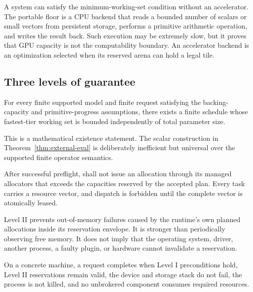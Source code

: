 A system can satisfy the minimum-working-set condition without an accelerator. The portable floor is a CPU backend that reads a bounded number of scalars or small vectors from persistent storage, performs a primitive arithmetic operation, and writes the result back. Such execution may be extremely slow, but it proves that GPU capacity is not the computability boundary. An accelerator backend is an optimization selected when its reserved arena can hold a legal tile.

\subsection{Three levels of guarantee}

\begin{definition}
For every finite supported model and finite request satisfying the backing-capacity and primitive-progress assumptions, there exists a finite schedule whose fastest-tier working set is bounded independently of total parameter size.
\end{definition}

This is a mathematical existence statement. The scalar construction in Theorem~\ref{thm:external-eval} is deliberately inefficient but universal over the supported finite operator semantics.

\begin{definition}
After successful preflight, \AMS shall not issue an allocation through its managed allocators that exceeds the capacities reserved by the accepted plan. Every task carries a resource vector, and dispatch is forbidden until the complete vector is atomically leased.
\end{definition}

Level II prevents out-of-memory failures caused by the runtime's own planned allocations inside its reservation envelope. It is stronger than periodically observing free memory. It does not imply that the operating system, driver, another process, a faulty plugin, or hardware cannot invalidate a reservation.

\begin{definition}
On a concrete machine, a request completes when Level I preconditions hold, Level II reservations remain valid, the device and storage stack do not fail, the process is not killed, and no unbrokered component consumes required resources.
\end{definition}

